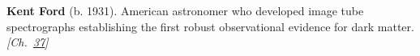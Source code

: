 \textbf{Kent Ford} (b. 1931). American astronomer who developed image tube spectrographs establishing the first robust observational evidence for dark matter. \emph{[Ch.~\hyperref[ch:darkmatterevidence]{37}]}

